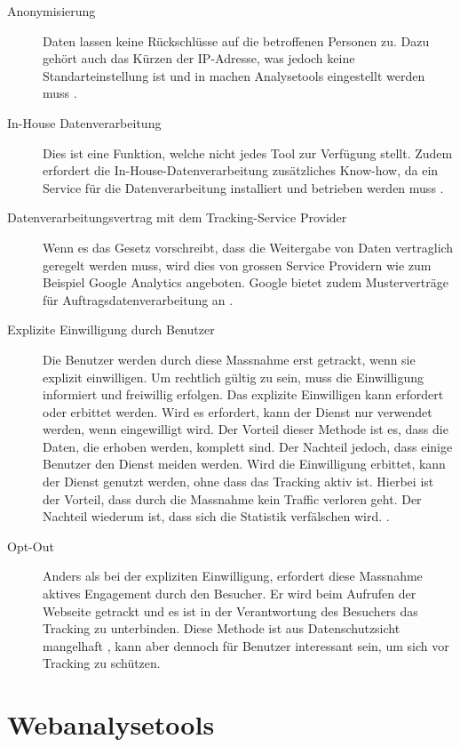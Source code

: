 \begin{description}
  \item[Anonymisierung] Daten lassen keine Rückschlüsse auf die betroffenen Personen zu. Dazu gehört auch das Kürzen der IP-Adresse, was jedoch keine Standarteinstellung ist und in machen Analysetools eingestellt werden muss \parencite[S. 3]{EcommerceUndDatenschutz}.
  \item[In-House Datenverarbeitung] Dies ist eine Funktion, welche nicht jedes Tool zur Verfügung stellt. Zudem erfordert die In-House-Datenverarbeitung zusätzliches Know-how, da ein Service für die Datenverarbeitung installiert und betrieben werden muss \parencite[S. 175]{nakatani2011toolselectionmethod}. 
  \item[Datenverarbeitungsvertrag mit dem Tracking-Service Provider] Wenn es das Gesetz vorschreibt, dass die Weitergabe von Daten vertraglich geregelt werden muss, wird dies von grossen Service Providern wie zum Beispiel Google Analytics angeboten. Google bietet zudem Musterverträge für Auftragsdatenverarbeitung an \parencite[S. 5]{EcommerceUndDatenschutz}. 
  \item[Explizite Einwilligung durch Benutzer] Die Benutzer werden durch diese Massnahme erst getrackt, wenn sie explizit einwilligen. Um rechtlich gültig zu sein, muss die Einwilligung informiert und freiwillig erfolgen. Das explizite Einwilligen kann erfordert oder erbittet werden. Wird es erfordert, kann der Dienst nur verwendet werden, wenn eingewilligt wird. Der Vorteil dieser Methode ist es, dass die Daten, die erhoben werden, komplett sind. Der Nachteil jedoch, dass einige Benutzer den Dienst meiden werden. Wird die Einwilligung erbittet, kann der Dienst genutzt werden, ohne dass das Tracking aktiv ist. Hierbei ist der Vorteil, dass durch die Massnahme kein Traffic verloren geht. Der Nachteil wiederum ist, dass sich die Statistik verfälschen wird. \parencite[S. 2-3]{EcommerceUndDatenschutz}.
  \item[Opt-Out] Anders als bei der expliziten Einwilligung, erfordert diese Massnahme aktives Engagement durch den Besucher. Er wird beim Aufrufen der Webseite getrackt und es ist in der Verantwortung des Besuchers das Tracking zu unterbinden. Diese Methode ist aus Datenschutzsicht mangelhaft \parencite[§§ 9 Abs. 4]{DSSGBERN}, kann aber dennoch für Benutzer interessant sein, um sich vor Tracking zu schützen.
\end{description}

\newpage

\section{Webanalysetools}

